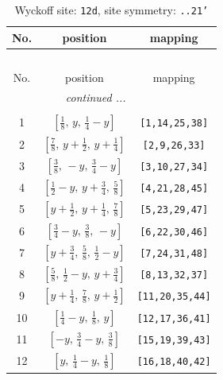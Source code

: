 \documentclass[fleqn,8pt]{jsarticle}
\begin{document}
\begin{longtable}{ccc}
\caption{Wyckoff site: {\tt 12d}, site symmetry: {\tt ..21'}}
 \\
 \hline \hline
No. & position & mapping \\ \hline \endfirsthead

\multicolumn{2}{l}{\tablename\ \thetable{}} \\
 \hline \hline
No. & position & mapping \\ \hline \endhead

 \hline \hline
\multicolumn{2}{r}{\footnotesize\it continued ...} \\ \endfoot

 \hline \hline
\multicolumn{2}{r}{} \\ \endlastfoot

1 & $\left[ \frac{1}{8},\, y,\, \frac{1}{4} - y \right]$ & {\tt [1,14,25,38]} \\ \hline
2 & $\left[ \frac{7}{8},\, y + \frac{1}{2},\, y + \frac{1}{4} \right]$ & {\tt [2,9,26,33]} \\ \hline
3 & $\left[ \frac{3}{8},\, - y,\, \frac{3}{4} - y \right]$ & {\tt [3,10,27,34]} \\ \hline
4 & $\left[ \frac{1}{2} - y,\, y + \frac{3}{4},\, \frac{5}{8} \right]$ & {\tt [4,21,28,45]} \\ \hline
5 & $\left[ y + \frac{1}{2},\, y + \frac{1}{4},\, \frac{7}{8} \right]$ & {\tt [5,23,29,47]} \\ \hline
6 & $\left[ \frac{3}{4} - y,\, \frac{3}{8},\, - y \right]$ & {\tt [6,22,30,46]} \\ \hline
7 & $\left[ y + \frac{3}{4},\, \frac{5}{8},\, \frac{1}{2} - y \right]$ & {\tt [7,24,31,48]} \\ \hline
8 & $\left[ \frac{5}{8},\, \frac{1}{2} - y,\, y + \frac{3}{4} \right]$ & {\tt [8,13,32,37]} \\ \hline
9 & $\left[ y + \frac{1}{4},\, \frac{7}{8},\, y + \frac{1}{2} \right]$ & {\tt [11,20,35,44]} \\ \hline
10 & $\left[ \frac{1}{4} - y,\, \frac{1}{8},\, y \right]$ & {\tt [12,17,36,41]} \\ \hline
11 & $\left[ - y,\, \frac{3}{4} - y,\, \frac{3}{8} \right]$ & {\tt [15,19,39,43]} \\ \hline
12 & $\left[ y,\, \frac{1}{4} - y,\, \frac{1}{8} \right]$ & {\tt [16,18,40,42]} \\
\end{longtable}
\renewcommand{\arraystretch}{1.2}
\end{document}
